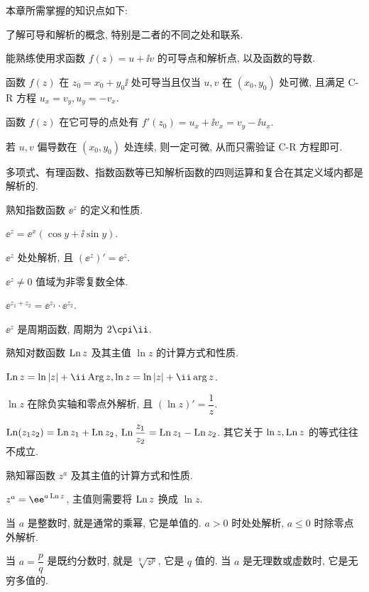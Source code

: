 本章所需掌握的知识点如下:
\begin{conclusion}
  \item 了解可导和解析的概念, 特别是二者的不同之处和联系.
  \item 能熟练使用\thmCR 求函数 $f(z)=u+\ii v$ 的可导点和解析点, 以及函数的导数.
  \begin{conclusion}
    \item 函数 $f(z)$ 在 $z_0=x_0+y_0\ii$ 处可导当且仅当 $u,v$ 在 $(x_0,y_0)$ 处可微, 且满足 C-R 方程 $u_x=v_y, u_y=-v_x$.
    \item 函数 $f(z)$ 在它可导的点处有 $f'(z_0)=u_x+\ii v_x=v_y-\ii u_x$.
    \item 若 $u,v$ 偏导数在 $(x_0,y_0)$ 处连续, 则一定可微, 从而只需验证 C-R 方程即可.
    \item 多项式、有理函数、指数函数等已知解析函数的四则运算和复合在其定义域内都是解析的.
  \end{conclusion}
  \item 熟知指数函数 $\ee^z$ 的定义和性质.
  \begin{conclusion}
    \item $\ee^z=\ee^x(\cos y+\ii\sin y)$.
    \item $\ee^z$ 处处解析, 且 $(\ee^z)'=\ee^z$.
    \item $\ee^z\neq 0$ 值域为非零复数全体.
    \item $\ee^{z_1+z_2}=\ee^{z_1}\cdot \ee^{z_2}$.
    \item $\ee^z$ 是周期函数, 周期为 $2\cpi\ii$.
  \end{conclusion}
  \item 熟知对数函数 $\operatorname{Ln} z$ 及其主值 $\ln z$ 的计算方式和性质.
  \begin{conclusion}
    \item $\Ln z=\ln\abs{z}+\ii\Arg z, \ln z=\ln\abs{z}+\ii\arg z$.
    \item $\ln z$ 在除负实轴和零点外解析, 且 $(\ln z)'=\dfrac1z$.
    \item $\operatorname{Ln}(z_1 z_2)=\operatorname{Ln} z_1+\operatorname{Ln} z_2$, $\operatorname{Ln}\dfrac{z_1}{z_2}=\operatorname{Ln} z_1-\operatorname{Ln} z_2$. 其它关于 $\ln z,\operatorname{Ln} z$ 的等式往往不成立.
  \end{conclusion}
  \item 熟知幂函数 $z^a$ 及其主值的计算方式和性质.
  \begin{conclusion}
    \item $z^a=\ee^{a\Ln z}$, 主值则需要将 $\operatorname{Ln} z$ 换成 $\ln z$.
    \item 当 $a$ 是整数时, 就是通常的乘幂, 它是单值的. $a>0$ 时处处解析, $a\le0$ 时除零点外解析.
    \item 当 $a=\dfrac pq$ 是既约分数时, 就是 $\sqrt[q]{z^p}$, 它是 $q$ 值的. 当 $a$ 是无理数或虚数时, 它是无穷多值的.

\end{conclusion}
\end{conclusion}
